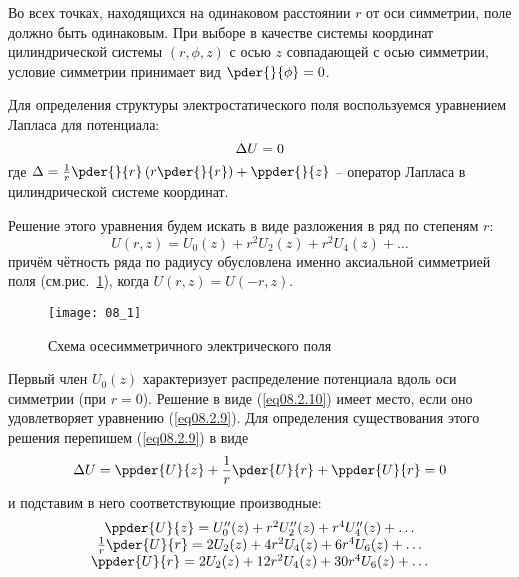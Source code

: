
Во всех точках, находящихся на одинаковом расстоянии \( r \) от оси симметрии, 
поле должно быть одинаковым. При выборе в качестве системы координат 
цилиндрической системы \( (r, \phi, z ) \) с осью \( z \) совпадающей с осью 
симметрии, условие симметрии принимает вид \( \pder{}{\phi} = 0 \).

Для определения структуры электростатического поля воспользуемся уравнением 
Лапласа для потенциала:
\begin{equation}
	\Delta U = 0
	\label{eq08.2.9}
\end{equation}
где 
\( \D = \frac{1}{r}\pder{}{r}\left( r \pder{}{r} \right) + \ppder{}{z} \) -- 
оператор Лапласа в цилиндрической системе координат.

Решение этого уравнения будем искать в виде разложения в ряд по степеням 
\( r \): 
\begin{equation}
	U(r,z) = U_0 (z) + r^2 U_2 (z) + r^2 U_4 (z) + \ldots
	\label{eq08.2.10}
\end{equation}
причём чётность ряда по радиусу обусловлена именно аксиальной симметрией поля 
(см.рис.~\ref{img08.1}), когда \( U(r,z) = U(-r,z) \).

\begin{figure}[h!]
	\center
	\texttt{[image: 08\_1]}
	\caption{Схема осесимметричного электрического поля}
	\label{img08.1}
\end{figure}

Первый член \( U_0 (z) \) характеризует распределение потенциала вдоль оси 
симметрии (при \( r = 0 \)). Решение в виде (\ref{eq08.2.10}) имеет место, 
если оно удовлетворяет уравнению (\ref{eq08.2.9}). Для определения 
существования этого решения перепишем (\ref{eq08.2.9}) в виде
\begin{equation}
	\D U = \ppder{U}{z} + \frac{1}{r}\pder{U}{r} + \ppder{U}{r} = 0
	\label{eq08.2.11}
\end{equation}
и подставим в него соответствующие производные:
\[
	\begin{array}{c}
		\ppder{U}{z} = U_0''(z) + r^2 U_2''(z) + r^4 U_4''(z) + \ldots \\
		\frac{1}{r}\pder{U}{r} = 2U_2(z) + 4r^2U_4(z) + 6r^4U_6(z) + \ldots \\
		\ppder{U}{r} = 2U_2(z) + 12r^2U_4(z) + 30r^4U_6(z) + \ldots
	\end{array}
\]

